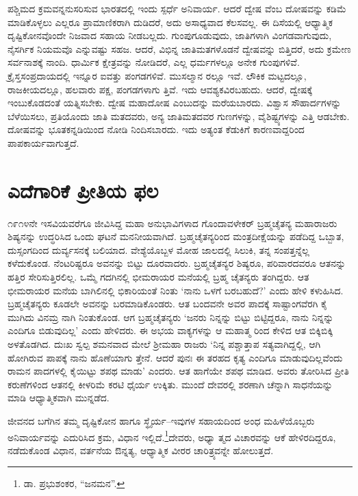ಪಶ್ಚಿಮದ ಕ್ರಮವನ್ನನುಸರಿಸುವ ಭಾರತದಲ್ಲಿ ಇಂದು ಸ್ಪರ್ಧೆ ಅನಿವಾರ್ಯ. ಆದರೆ ದ್ವೇಷ ವೆಂಬ ದೋಷವನ್ನು ಕಡಿಮೆ ಮಾಡಿಕೊಳ್ಳಲು ಎಲ್ಲರೂ ಪ್ರಾಮಾಣಿಕರಾಗಿ ದುಡಿದರೆ, ಅದು ಅಸಾಧ್ಯವಾದ ಕೆಲಸವಲ್ಲ. ಈ ದಿಸೆಯಲ್ಲಿ ಆಧ್ಯಾತ್ಮಿಕ ದೃಷ್ಟಿಕೋನವೊಂದೇ ನಿಜವಾದ ಸಹಾಯ ನೀಡಬಲ್ಲದು. ಗುಂಪುಗೂಡುವುದು, ಜಾತಿಗಳಾಗಿ ವಿಂಗಡವಾಗುವುದು, ನೈಸರ್ಗಿಕ ನಿಯಮವೊ ಎನ್ನುವಷ್ಟು ಸಹಜ. ಆದರೆ, ವಿಭಿನ್ನ ಜಾತಿಮತಗಳೊಡನೆ ದ್ವೇಷವನ್ನು ಬಿತ್ತಿದರೆ, ಅದು ಕ್ರಮೇಣ ಸರ್ವನಾಶಕ್ಕೆ ನಾಂದಿ. ಧಾರ್ಮಿಕ ಕ್ಷೇತ್ರವನ್ನು ನೋಡಿದರೆ, ಎಲ್ಲ ಧರ್ಮಗಳಲ್ಲೂ ಅನೇಕ ಗುಂಪುಗಳಿವೆ. ಕ್ರೈಸ್ತಸಂಪ್ರದಾಯದಲ್ಲಿ ಇನ್ನೂರ ಐವತ್ತು ಪಂಗಡಗಳಿವೆ. ಮುಸಲ್ಮಾನ ರಲ್ಲೂ ಇವೆ. ಲೌಕಿಕ ಮಟ್ಟದಲ್ಲೂ, ರಾಜಕೀಯದಲ್ಲೂ, ಹಲವಾರು ಪಕ್ಷ, ಪಂಗಡಗಳಾಗು ತ್ತಿವೆ. ಇದು ಆವಶ್ಯಕವಿರಬಹುದು. ಆದರೆ, ದ್ವೇಷಕ್ಕೆ ಇಂಬುಕೊಡದಂತೆ ಯತ್ನಿಸಬೇಕು. ದ್ವೇಷ ಮಹಾದೋಷ ಎಂಬುದನ್ನು ಮರೆಯಬಾರದು. ವಿಶ್ವಾಸ ಸೌಹಾರ್ದಗಳನ್ನು ಬೆಳೆಯಿಸಲು, ಪ್ರತಿಯೊಂದು ಜಾತಿ ಮತದವರು, ಅನ್ಯ ಜಾತಿಮತದವರ ಗುಣಗಳನ್ನು, ವೈಶಿಷ್ಟ್ಯಗಳನ್ನು ಎತ್ತಿ ಆಡಬೇಕು. ದೋಷವನ್ನು ಭೂತಕನ್ನಡಿಯಿಂದ ನೋಡಿ ನಿಂದಿಸಬಾರದು. ಇದು ಅತ್ಯಂತ ಕೆಡುಕಿಗೆ ಕಾರಣವಾದ್ದರಿಂದ ಪಾಪಕಾರ್ಯವಾಗುತ್ತದೆ.


\section{ಎದೆಗಾರಿಕೆ ಪ್ರೀತಿಯ ಫಲ}

೧೯೧೪ನೇ ಇಸವಿಯವರೆಗೂ ಜೀವಿಸಿದ್ದ ಮಹಾ ಅನುಭಾವಿಗಳಾದ ಗೊಂದಾವಳೇಕರ್ ಬ್ರಹ್ಮಚೈತನ್ಯ ಮಹಾರಾಜರು ಶಿಷ್ಯನನ್ನು ಉದ್ಧರಿಸಿದ ಒಂದು ಘಟನೆ ಮನನೀಯವಾಗಿದೆ. ಬ್ರಹ್ಮಚೈತನ್ಯರಿಂದ ಮಂತ್ರದೀಕ್ಷೆಯನ್ನು ಪಡೆದಿದ್ದ ಒಬ್ಬಾತ, ದುಸ್ಸಂಗದಿಂದ ದುರ್ವ್ಯಸನಕ್ಕೆ ಬಲಿಯಾದ. ವೇಶ್ಯೆಯೊಬ್ಬಳ ಮೋಹ ಜಾಲದಲ್ಲಿ ಸಿಲುಕಿ, ತನ್ನ ಸಂಪತ್ತನ್ನೆಲ್ಲ ಕಳೆದುಕೊಂಡ. ನೆಂಟರಿಷ್ಟರೂ ಅವನನ್ನು ಬಿಟ್ಟು ದೂರವಾದರು. ಬ್ರಹ್ಮಚೈತನ್ಯರ ಶಿಷ್ಯರೂ, ಪರಿವಾರದವರೂ ಆತನನ್ನು ಹತ್ತಿರ ಸೇರಿಸುತ್ತಿರಲಿಲ್ಲ. ಒಮ್ಮೆ ಗದಗಿನಲ್ಲಿ ಭೀಮರಾಯರ ಮನೆಯಲ್ಲಿ ಬ್ರಹ್ಮ ಚೈತನ್ಯರು ತಂಗಿದ್ದರು. ಆತ ಭೀಮರಾಯರ ಮನೆಯ ಬಾಗಿಲಿನಲ್ಲಿ ಭಿಕಾರಿಯಂತೆ ನಿಂತು ‘ನಾನು ಒಳಗೆ ಬರಬಹುದೆ?’ ಎಂದು ಹೇಳಿ ಕಳುಹಿಸಿದ. ಬ್ರಹ್ಮಚೈತನ್ಯರು ಕೂಡಲೇ ಅವನನ್ನು ಬರಮಾಡಿಕೊಂಡರು. ಆತ ಬಂದವನೇ ಅವರ ಪಾದಕ್ಕೆ ಸಾಷ್ಟಾಂಗವೆರಗಿ ಕೈ ಮುಗಿದು ವಿನಮ್ರ ನಾಗಿ ನಿಂತುಕೊಂಡ. ಆಗ ಬ್ರಹ್ಮಚೈತನ್ಯರು ‘ಜನರು ನಿನ್ನನ್ನು ಬಿಟ್ಟು ಬಿಟ್ಟಿದ್ದರೂ, ನಾನು ನಿನ್ನನ್ನು ಎಂದಿಗೂ ಬಿಡುವುದಿಲ್ಲ’ ಎಂದು ಹೇಳಿದರು. ಈ ಅಭಯ ವಾಕ್ಯಗಳನ್ನು ಆ ಮಹಾತ್ಮ ರಿಂದ ಕೇಳಿದ ಆತ ಬಿಕ್ಕಿಬಿಕ್ಕಿ ಅಳತೊಡಗಿದ. ದುಃಖ ಸ್ವಲ್ಪ ಶಮನವಾದ ಮೇಲೆ ಶ‍್ರೀಮಹಾ ರಾಜರು ‘ನಿನ್ನ ಪಶ್ಚಾತ್ತಾಪ ಸತ್ಯವಾಗಿದ್ದಲ್ಲಿ, ಆಗಿ ಹೋಗಿರುವ ಪಾಪಕ್ಕೆ ನಾನು ಹೊಣೆಯಾಗು ತ್ತೇನೆ. ಆದರೆ ಪುನಃ ಈ ತರಹದ ಕೃತ್ಯ ಎಂದಿಗೂ ಮಾಡುವುದಿಲ್ಲವೆಂದು ರಾಮನ ಪಾದಗಳಲ್ಲಿ ಕೈಯಿಟ್ಟು ಶಪಥ ಮಾಡು’ ಎಂದರು. ಆತ ಹಾಗೆಯೇ ಶಪಥ ಮಾಡಿದ. ಅವರು ತೋರಿಸಿದ ಪ್ರೀತಿ ಕರುಣೆಗಳಿಂದ ಆತನಲ್ಲಿ ಕೀಳರಿಮೆ ಕರಟಿ ಧೈರ್ಯ ಉಕ್ಕಿತು. ಮುಂದೆ ದೇವರಲ್ಲಿ ಶರಣಾಗಿ ಚೆನ್ನಾಗಿ ಸಾಧನೆಯನ್ನು ಮಾಡಿ ಆಧ್ಯಾತ್ಮಿಕವಾಗಿ ಮುನ್ನಡೆದ.

ಜೀವನದ ಬಗೆಗಿನ ತಮ್ಮ ದೃಷ್ಟಿಕೋನ ಹಾಗೂ ಸ್ಥೈರ್ಯ–ಇವುಗಳ ಸಹಾಯದಿಂದ ಅಂಧ ಮಹಿಳೆಯೊಬ್ಬರು ಅನಿವಾರ್ಯವನ್ನು ಎದುರಿಸಿದ ಕ್ರಮ, ವಿಧಾನ ಇಲ್ಲಿದೆ.\footnote{ಡಾ. ಪ್ರಭುಶಂಕರ, “ಜನಮನ”.}ದೇವರು, ಅಧ್ಯಾ ತ್ಮದ ವಿಚಾರವನ್ನು ಆಕೆ ಹೇಳಿರದಿದ್ದರೂ, ನಡೆದುಕೊಂಡ ವಿಧಾನ, ವರ್ತನೆಯ ಔನ್ನತ್ಯ, ಆಧ್ಯಾತ್ಮಿಕ ವೀರರ ಚಾರಿತ್ರ್ಯವನ್ನೇ ಹೋಲುತ್ತದೆ.

